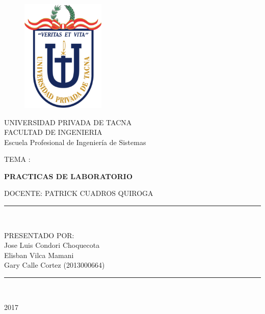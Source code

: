 \documentclass[a4paper,openright,12pt]{book}
\begin{document}
\begin{titlepage}
\begin{center}
\begin{figure}[htb]
\begin{center}
\includegraphics[width=4cm]{./images/upt}
\end{center}
\end{figure}

UNIVERSIDAD PRIVADA DE TACNA\\
\vspace*{0.10in}
FACULTAD DE INGENIERIA\\
Escuela Profesional de Ingeniería de Sistemas\\
\vspace*{0.2in}
\begin{large}
TEMA : \\
\end{large}
\vspace*{0.2in}
\begin{Large}
\textbf{PRACTICAS DE LABORATORIO} \\
\end{Large}
\vspace*{0.3in}
\begin{large}
DOCENTE: PATRICK CUADROS QUIROGA\\
\end{large}
\vspace*{0.3in}
\rule{80mm}{0.1mm}\\
\vspace*{0.1in}
\begin{large}
PRESENTADO POR: \\
Jose Luis Condori Choquecota \\
Elisban Vilca Mamani\\
Gary Calle Cortez (2013000664)

\end{large}
\rule{80mm}{0.1mm}\\
\begin{large}
2017\\
\end{large}
\end{center}
\end{titlepage}
\end{document}
